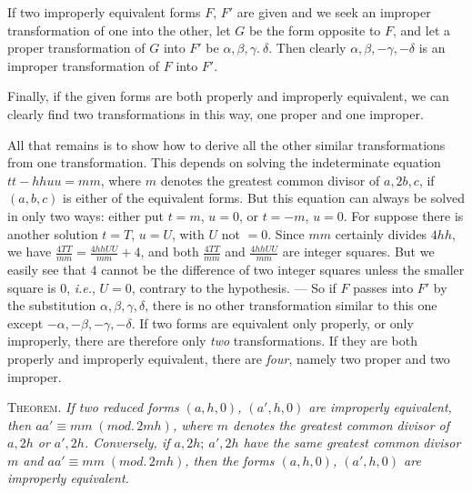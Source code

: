If two improperly equivalent forms $F$, $F'$ are given and we seek an improper transformation of one into the other, let $G$ be the form opposite to $F$, and let a proper transformation of $G$ into $F'$ be $\alpha,\beta,\gamma.\ \delta$. Then clearly $\alpha,\beta,-\gamma,-\delta$ is an improper transformation of $F$ into $F'$.

Finally, if the given forms are both properly and improperly equivalent, we can clearly find two transformations in this way, one proper and one improper.

All that remains is to show how to derive all the other similar transformations from one transformation. This depends on solving the indeterminate equation $tt-hhuu=mm$, where $m$ denotes the greatest common divisor of $a,2b,c$, if $(a,b,c)$ is either of the equivalent forms. But this equation can always be solved in only two ways: either put $t=m$, $u=0$, or $t=-m$, $u=0$. For suppose there is another solution $t=T$, $u=U$, with $U$ not $=0$. Since $mm$ certainly divides $4hh$, we have $\frac{4TT}{mm}=\frac{4hhUU}{mm}+4$, and both $\frac{4TT}{mm}$ and $\frac{4hhUU}{mm}$ are integer squares. But we easily see that $4$ cannot be the difference of two integer squares unless the smaller square is $0$, \textit{i.e.}, $U=0$, contrary to the hypothesis. --- So if $F$ passes into $F'$ by the substitution $\alpha,\beta,\gamma,\delta$, there is no other transformation similar to this one except $-\alpha,-\beta,-\gamma,-\delta$. If two forms are equivalent only properly, or only improperly, there are therefore only \textit{two} transformations. If they are both properly and improperly equivalent, there are \textit{four}, namely two proper and two improper.

\textsc{Theorem.} \textit{If two reduced forms $(a,h,0)$, $(a',h,0)$ are improperly equivalent, then $aa'\equiv mm\;(\mathit{mod.}\,2mh)$, where $m$ denotes the greatest common divisor of $a,2h$ or $a',2h$. Conversely, if $a,2h;\ a',2h$ have the same greatest common}
\textit{divisor $m$ and $aa'\equiv mm\;(\mathit{mod.}\,2mh)$, then the forms $(a,h,0)$, $(a',h,0)$ are improperly equivalent.}

